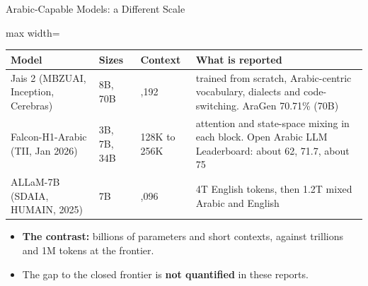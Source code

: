 \begin{frame}{Arabic-Capable Models: a Different Scale}
    \begin{center}
    \footnotesize
    \renewcommand{\arraystretch}{1.15}
    \begin{adjustbox}{max width=\linewidth}\begin{tabular}{>{\raggedright\arraybackslash}p{3.3cm}>{\raggedright\arraybackslash}p{1.5cm}>{\raggedright\arraybackslash}p{1.4cm}>{\raggedright\arraybackslash}p{6.0cm}}
        \toprule
        \textbf{Model} & \textbf{Sizes} & \textbf{Context} & \textbf{What is reported} \\
        \midrule
        Jais 2 (MBZUAI, Inception, Cerebras) & 8B, 70B & 8,192 & trained from scratch, Arabic-centric vocabulary, dialects and code-switching. AraGen 70.71\% (70B) \\
        Falcon-H1-Arabic (TII, Jan 2026) & 3B, 7B, 34B & 128K to 256K & attention and state-space mixing in each block. Open Arabic LLM Leaderboard: about 62, 71.7, about 75 \\
        ALLaM-7B (SDAIA, HUMAIN, 2025) & 7B & 4,096 & 4T English tokens, then 1.2T mixed Arabic and English \\
        \bottomrule
    \end{tabular}\end{adjustbox}
    \end{center}
    \begin{itemize}\itemsep0.4em
        \item \textbf{The contrast:} billions of parameters and short contexts, against trillions and 1M tokens at the frontier.

        \item The gap to the closed frontier is \textbf{not quantified} in these reports.
    \end{itemize}
\end{frame}


